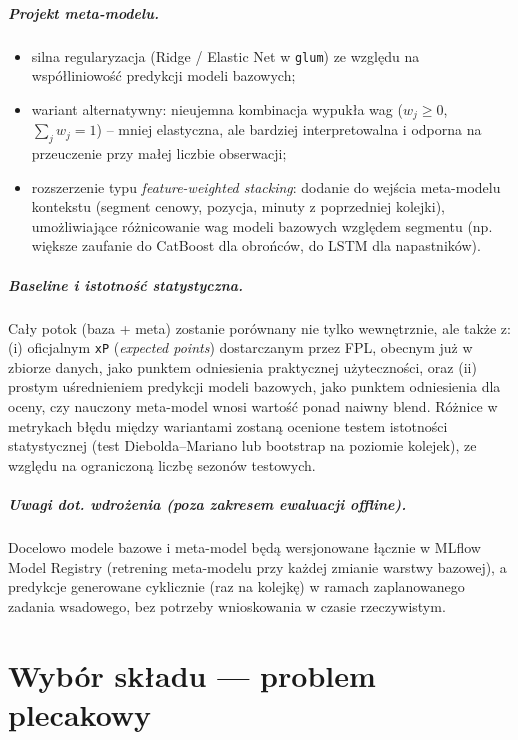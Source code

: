 \documentclass[a4paper,twoside,11pt]{mwrep}
\theoremstyle{plain} \newtheorem{thm}{Twierdzenie}
\theoremstyle{plain} \newtheorem{lem}{Lemat}
\theoremstyle{definition} \newtheorem{defn}{Definicja}
\theoremstyle{remark} \newtheorem*{rem}{Wniosek}
\begin{document}
\paragraph{Projekt meta-modelu.}
\begin{itemize}
    \item silna regularyzacja (Ridge / Elastic Net w \texttt{glum}) ze
    względu na współliniowość predykcji modeli bazowych;
    \item wariant alternatywny: nieujemna kombinacja wypukła wag
    ($w_j \geq 0$, $\sum_j w_j = 1$) -- mniej elastyczna, ale bardziej
    interpretowalna i odporna na przeuczenie przy małej liczbie
    obserwacji;
    \item rozszerzenie typu \emph{feature-weighted stacking}: dodanie do
    wejścia meta-modelu kontekstu (segment cenowy, pozycja, minuty z
    poprzedniej kolejki), umożliwiające różnicowanie wag modeli bazowych
    względem segmentu (np. większe zaufanie do CatBoost dla obrońców, do
    LSTM dla napastników).
\end{itemize}

\paragraph{Baseline i istotność statystyczna.}
Cały potok (baza + meta) zostanie porównany nie tylko wewnętrznie, ale
także z: (i) oficjalnym \texttt{xP} (\emph{expected points}) dostarczanym
przez FPL, obecnym już w zbiorze danych, jako punktem odniesienia
praktycznej użyteczności, oraz (ii) prostym uśrednieniem predykcji
modeli bazowych, jako punktem odniesienia dla oceny, czy nauczony
meta-model wnosi wartość ponad naiwny blend. Różnice w metrykach błędu
między wariantami zostaną ocenione testem istotności statystycznej
(test Diebolda--Mariano lub bootstrap na poziomie kolejek), ze względu na
ograniczoną liczbę sezonów testowych.

\paragraph{Uwagi dot. wdrożenia (poza zakresem ewaluacji offline).}
Docelowo modele bazowe i meta-model będą wersjonowane łącznie w MLflow
Model Registry (retrening meta-modelu przy każdej zmianie warstwy bazowej),
a predykcje generowane cyklicznie (raz na kolejkę) w ramach zaplanowanego
zadania wsadowego, bez potrzeby wnioskowania w czasie rzeczywistym.


\chapter{Wybór składu --- problem plecakowy}\label{ch:squad}
\end{document}
